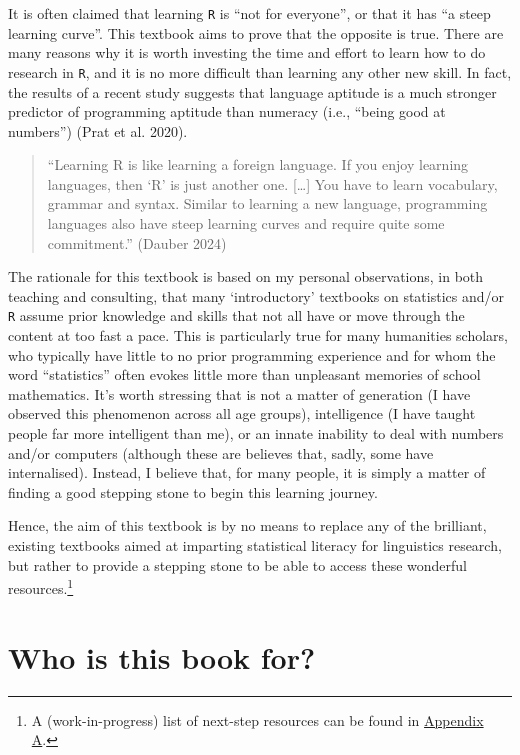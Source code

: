 \documentclass[
  letterpaper,
  DIV=11,
  numbers=noendperiod]{scrreprt}
\begin{document}
It is often claimed that learning \texttt{R} is ``not for everyone'', or
that it has ``a steep learning curve''. This textbook aims to prove that
the opposite is true. There are many reasons why it is worth investing
the time and effort to learn how to do research in \texttt{R}, and it is
no more difficult than learning any other new skill. In fact, the
results of a recent study suggests that language aptitude is a much
stronger predictor of programming aptitude than numeracy (i.e., ``being
good at numbers'') (Prat et al. 2020).

\begin{quote}
``Learning R is like learning a foreign language. If you enjoy learning
languages, then `R' is just another one. {[}\ldots{]} You have to learn
vocabulary, grammar and syntax. Similar to learning a new language,
programming languages also have steep learning curves and require quite
some commitment.'' (Dauber 2024)
\end{quote}

The rationale for this textbook is based on my personal observations, in
both teaching and consulting, that many `introductory' textbooks on
statistics and/or \texttt{R} assume prior knowledge and skills that not
all have or move through the content at too fast a pace. This is
particularly true for many humanities scholars, who typically have
little to no prior programming experience and for whom the word
``statistics'' often evokes little more than unpleasant memories of
school mathematics. It's worth stressing that is not a matter of
generation (I have observed this phenomenon across all age groups),
intelligence (I have taught people far more intelligent than me), or an
innate inability to deal with numbers and/or computers (although these
are believes that, sadly, some have internalised). Instead, I believe
that, for many people, it is simply a matter of finding a good stepping
stone to begin this learning journey.

Hence, the aim of this textbook is by no means to replace any of the
brilliant, existing textbooks aimed at imparting statistical literacy
for linguistics research, but rather to provide a stepping stone to be
able to access these wonderful resources.\footnote{A (work-in-progress)
  list of next-step resources can be found in
  \href{https://elenlefoll.github.io/RstatsTextbook/FurtherResources.html}{Appendix
  A}.}

\section*{Who is this book for?}\label{who-is-this-book-for}
\end{document}
